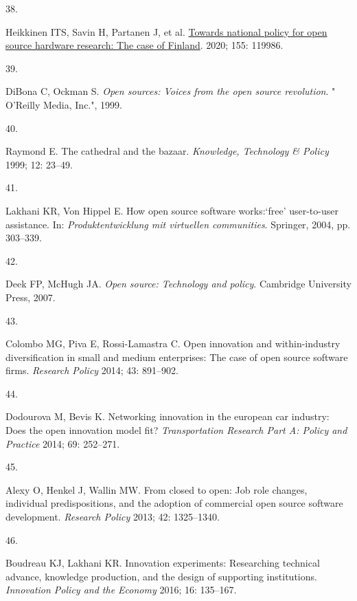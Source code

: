 \documentclass[
  11pt,
  a4paperpaper,
  onecolumn]{article}
\newlength{\cslhangindent}
\newlength{\csllabelwidth}
\newlength{\cslentryspacingunit} %
\newenvironment{CSLReferences}[2] %
 {%
  \setlength{\parindent}{0pt}
  \ifodd #1
  \let\oldpar\par
  \def\par{\hangindent=\cslhangindent\oldpar}
  \fi
  \setlength{\parskip}{#2\cslentryspacingunit}
 }%
 {}
\newcommand{\CSLLeftMargin}[1]{\parbox[t]{\csllabelwidth}{#1}}
\newcommand{\CSLRightInline}[1]{\parbox[t]{\linewidth - \csllabelwidth}{#1}\break}
\begin{document}
\begin{CSLReferences}{0}{0}
\leavevmode{}%
\CSLLeftMargin{38. }%
\CSLRightInline{Heikkinen ITS, Savin H, Partanen J, et al.
\href{https://doi.org/10.1016/j.techfore.2020.119986}{Towards national
policy for open source hardware research: {The} case of {Finland}}.
2020; 155: 119986.}

\leavevmode{}%
\CSLLeftMargin{39. }%
\CSLRightInline{DiBona C, Ockman S. \emph{Open sources: Voices from the
open source revolution}. " O'Reilly Media, Inc.", 1999.}

\leavevmode{}%
\CSLLeftMargin{40. }%
\CSLRightInline{Raymond E. The cathedral and the bazaar.
\emph{Knowledge, Technology \& Policy} 1999; 12: 23--49.}

\leavevmode{}%
\CSLLeftMargin{41. }%
\CSLRightInline{Lakhani KR, Von Hippel E. How open source software
works:{`free'} user-to-user assistance. In: \emph{Produktentwicklung mit
virtuellen communities}. Springer, 2004, pp. 303--339.}

\leavevmode{}%
\CSLLeftMargin{42. }%
\CSLRightInline{Deek FP, McHugh JA. \emph{Open source: Technology and
policy}. Cambridge University Press, 2007.}

\leavevmode{}%
\CSLLeftMargin{43. }%
\CSLRightInline{Colombo MG, Piva E, Rossi-Lamastra C. Open innovation
and within-industry diversification in small and medium enterprises: The
case of open source software firms. \emph{Research Policy} 2014; 43:
891--902.}

\leavevmode{}%
\CSLLeftMargin{44. }%
\CSLRightInline{Dodourova M, Bevis K. Networking innovation in the
european car industry: Does the open innovation model fit?
\emph{Transportation Research Part A: Policy and Practice} 2014; 69:
252--271.}

\leavevmode{}%
\CSLLeftMargin{45. }%
\CSLRightInline{Alexy O, Henkel J, Wallin MW. From closed to open: Job
role changes, individual predispositions, and the adoption of commercial
open source software development. \emph{Research Policy} 2013; 42:
1325--1340.}

\leavevmode{}%
\CSLLeftMargin{46. }%
\CSLRightInline{Boudreau KJ, Lakhani KR. Innovation experiments:
Researching technical advance, knowledge production, and the design of
supporting institutions. \emph{Innovation Policy and the Economy} 2016;
16: 135--167.}


\end{CSLReferences}
\end{document}
